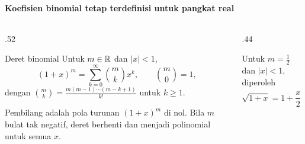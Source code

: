 \documentclass{../../kalkulus-ppt}
\begin{document}
\begin{frame}{\insertsection}
    \framesubtitle{Koefisien binomial tetap terdefinisi untuk pangkat real}
    \begin{columns}[c,onlytextwidth]
        \begin{column}{.52\textwidth}
            \begin{block}{Deret binomial}
                Untuk $m\in\mathbb{R}$ dan $|x|<1$,
                \[
                    (1+x)^m=\sum_{k=0}^\infty\binom{m}{k}x^k,\qquad
                    \binom{m}{0}=1,
                \]
                dengan $\displaystyle\binom{m}{k}
                =\frac{m(m-1)\cdots(m-k+1)}{k!}$ untuk $k\ge1$.
            \end{block}
            Pembilang adalah pola turunan $(1+x)^m$ di nol.
            Bila $m$ bulat tak negatif, deret berhenti
            dan menjadi polinomial untuk semua $x$.
        \end{column}
        \begin{column}{.44\textwidth}
            \begin{contoh}
                Untuk $m=\tfrac12$ dan $|x|<1$, diperoleh
                \[
                    \sqrt{1+x}=1+\frac x2-\frac{x^2}{8}
                        +\frac{x^3}{16}-\cdots.
                \]
            \end{contoh}
        \end{column}
    \end{columns}
\end{frame}
\end{document}
